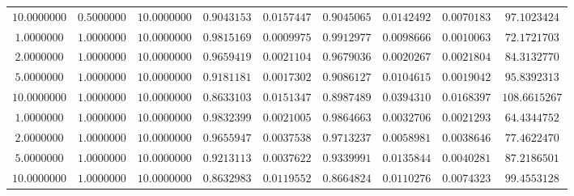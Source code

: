 \begin{tabular}{ccccccccc}
$10.0000000$ & $0.5000000$ & $10.0000000$ & $0.9043153$ & $0.0157447$ & $0.9045065$ & $0.0142492$ & $0.0070183$ & $97.1023424$\\
$1.0000000$ & $1.0000000$ & $10.0000000$ & $0.9815169$ & $0.0009975$ & $0.9912977$ & $0.0098666$ & $0.0010063$ & $72.1721703$\\
$2.0000000$ & $1.0000000$ & $10.0000000$ & $0.9659419$ & $0.0021104$ & $0.9679036$ & $0.0020267$ & $0.0021804$ & $84.3132770$\\
$5.0000000$ & $1.0000000$ & $10.0000000$ & $0.9181181$ & $0.0017302$ & $0.9086127$ & $0.0104615$ & $0.0019042$ & $95.8392313$\\
$10.0000000$ & $1.0000000$ & $10.0000000$ & $0.8633103$ & $0.0151347$ & $0.8987489$ & $0.0394310$ & $0.0168397$ & $108.6615267$\\
$1.0000000$ & $1.0000000$ & $10.0000000$ & $0.9832399$ & $0.0021005$ & $0.9864663$ & $0.0032706$ & $0.0021293$ & $64.4344752$\\
$2.0000000$ & $1.0000000$ & $10.0000000$ & $0.9655947$ & $0.0037538$ & $0.9713237$ & $0.0058981$ & $0.0038646$ & $77.4622470$\\
$5.0000000$ & $1.0000000$ & $10.0000000$ & $0.9213113$ & $0.0037622$ & $0.9339991$ & $0.0135844$ & $0.0040281$ & $87.2186501$\\
$10.0000000$ & $1.0000000$ & $10.0000000$ & $0.8632983$ & $0.0119552$ & $0.8664824$ & $0.0110276$ & $0.0074323$ & $99.4553128$\\
\end{tabular}
